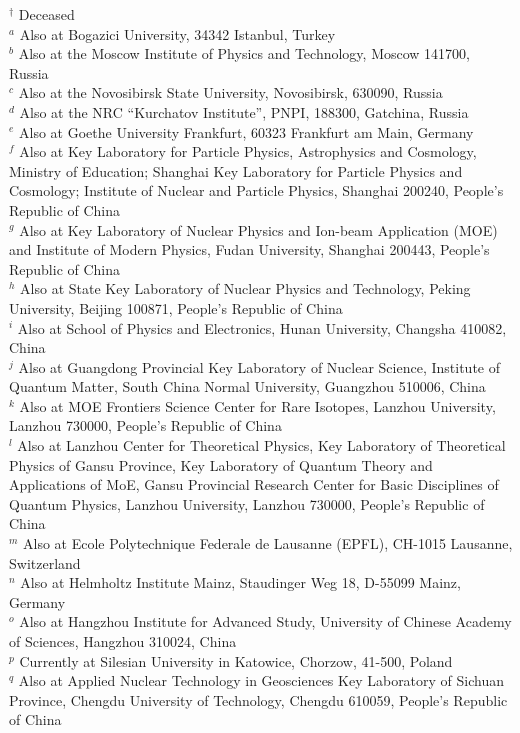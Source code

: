 \documentclass[prd,aps,reprint,noeprint,superscriptaddress,amsmath, amssymb]{revtex4-1}
\begin{document}
\begin{widetext}
\begin{center}
{\vspace{0.2cm}
$^{\dagger}$ Deceased\\
$^{a}$ Also at Bogazici University, 34342 Istanbul, Turkey\\
$^{b}$ Also at the Moscow Institute of Physics and Technology, Moscow 141700, Russia\\
$^{c}$ Also at the Novosibirsk State University, Novosibirsk, 630090, Russia\\
$^{d}$ Also at the NRC ``Kurchatov Institute'', PNPI, 188300, Gatchina, Russia\\
$^{e}$ Also at Goethe University Frankfurt, 60323 Frankfurt am Main, Germany\\
$^{f}$ Also at Key Laboratory for Particle Physics, Astrophysics and Cosmology, Ministry of Education; Shanghai Key Laboratory for Particle Physics and Cosmology; Institute of Nuclear and Particle Physics, Shanghai 200240, People's Republic of China\\
$^{g}$ Also at Key Laboratory of Nuclear Physics and Ion-beam Application (MOE) and Institute of Modern Physics, Fudan University, Shanghai 200443, People's Republic of China\\
$^{h}$ Also at State Key Laboratory of Nuclear Physics and Technology, Peking University, Beijing 100871, People's Republic of China\\
$^{i}$ Also at School of Physics and Electronics, Hunan University, Changsha 410082, China\\
$^{j}$ Also at Guangdong Provincial Key Laboratory of Nuclear Science, Institute of Quantum Matter, South China Normal University, Guangzhou 510006, China\\
$^{k}$ Also at MOE Frontiers Science Center for Rare Isotopes, Lanzhou University, Lanzhou 730000, People's Republic of China\\
$^{l}$ Also at
Lanzhou Center for Theoretical Physics,
Key Laboratory of Theoretical Physics of Gansu Province,
Key Laboratory of Quantum Theory and Applications of MoE,
Gansu Provincial Research Center for Basic Disciplines of Quantum Physics,
Lanzhou University, Lanzhou 730000, People's Republic of China\\
$^{m}$ Also at Ecole Polytechnique Federale de Lausanne (EPFL), CH-1015 Lausanne, Switzerland\\
$^{n}$ Also at Helmholtz Institute Mainz, Staudinger Weg 18, D-55099 Mainz, Germany\\
$^{o}$ Also at Hangzhou Institute for Advanced Study, University of Chinese Academy of Sciences, Hangzhou 310024, China\\
$^{p}$ Currently at Silesian University in Katowice, Chorzow, 41-500, Poland\\
$^{q}$ Also at Applied Nuclear Technology in Geosciences Key Laboratory of Sichuan Province, Chengdu University of Technology, Chengdu 610059, People's Republic of China\\
}
\end{center}
\end{widetext}
\end{document}
